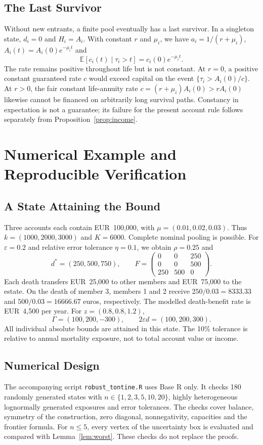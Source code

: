 \documentclass[11pt,a4paper]{article}
\theoremstyle{definition}\newtheorem{definition}[theorem]{Definition}
\theoremstyle{remark}\newtheorem{remark}[theorem]{Remark}
\newcommand{\E}{\mathbb E}
\begin{document}
\subsection{The Last Survivor}
Without new entrants, a finite pool eventually has a last survivor. In a singleton state, $d_i=0$ and $H_i=A_i$. With constant $r$ and $\mu_i$, we have $a_i=1/(r+\mu_i)$, $A_i(t)=A_i(0)e^{-\mu_i t}$ and
\[
\E[c_i(t)\mid\tau_i>t]=c_i(0)e^{-\mu_i t}.
\]
The rate remains positive throughout life but is not constant. At $r=0$, a positive constant guaranteed rate $c$ would exceed capital on the event $\{\tau_i>A_i(0)/c\}$. At $r>0$, the fair constant life-annuity rate $c=(r+\mu_i)A_i(0)>rA_i(0)$ likewise cannot be financed on arbitrarily long survival paths. Constancy in expectation is not a guarantee; its failure for the present account rule follows separately from Proposition~\ref{prop:income}.

\section{Numerical Example and Reproducible Verification}\label{sec:numerics}
\subsection{A State Attaining the Bound}
Three accounts each contain EUR~100,000, with $\mu=(0.01,0.02,0.03)$. Thus $k=(1000,2000,3000)$ and $K=6000$. Complete nominal pooling is possible. For $\varepsilon=0.2$ and relative error tolerance $\eta=0.1$, we obtain $\rho=0.25$ and
\[
d^*=(250,500,750),\qquad
F=\begin{pmatrix}0&0&250\\0&0&500\\250&500&0\end{pmatrix}.
\]
Each death transfers EUR~25,000 to other members and EUR~75,000 to the estate. On the death of member 3, members 1 and 2 receive $250/0.03=8333.33$ and $500/0.03=16666.67$ euros, respectively. The modelled death-benefit rate is EUR~4,500 per year. For $z=(0.8,0.8,1.2)$,
\[
\Gamma=(100,200,-300),\qquad 2\varepsilon d=(100,200,300).
\]
All individual absolute bounds are attained in this state. The 10\% tolerance is relative to annual mortality exposure, not to total account value or income.

\subsection{Numerical Design}
The accompanying script \texttt{robust\_tontine.R} uses Base R only. It checks 180 randomly generated states with $n\in\{1,2,3,5,10,20\}$, highly heterogeneous lognormally generated exposures and error tolerances. The checks cover balance, symmetry of the construction, zero diagonal, nonnegativity, capacities and the frontier formula. For $n\le5$, every vertex of the uncertainty box is evaluated and compared with Lemma~\ref{lem:worst}. These checks do not replace the proofs.
\end{document}
